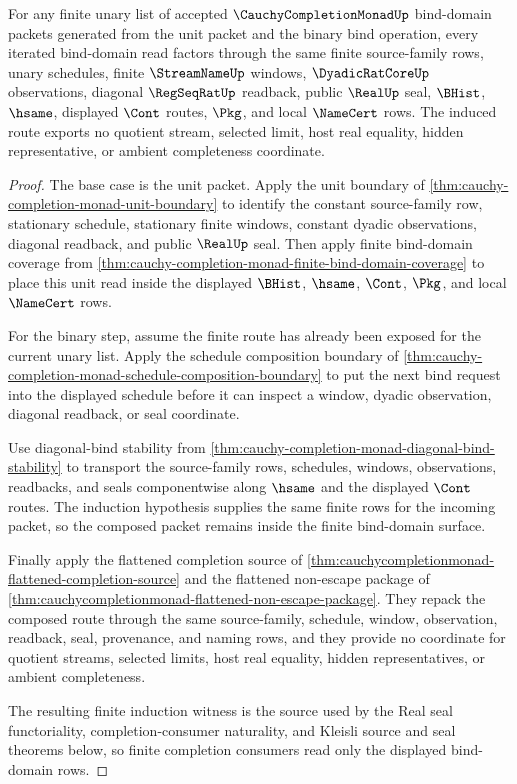 \begin{theorem}
\label{thm:cauchy-completion-monad-finite-bind-domain-induction}
For any finite unary list of accepted $\CauchyCompletionMonadUp$ bind-domain packets generated from the unit packet and the binary bind operation, every iterated bind-domain read factors through the same finite source-family rows, unary schedules, finite $\StreamNameUp$ windows, $\DyadicRatCoreUp$ observations, diagonal $\RegSeqRatUp$ readback, public $\RealUp$ seal, $\BHist$, $\hsame$, displayed $\Cont$ routes, $\Pkg$, and local $\NameCert$ rows. The induced route exports no quotient stream, selected limit, host real equality, hidden representative, or ambient completeness coordinate.
\end{theorem}
\begin{proof}
The base case is the unit packet. Apply the unit boundary of \autoref{thm:cauchy-completion-monad-unit-boundary} to identify the constant source-family row, stationary schedule, stationary finite windows, constant dyadic observations, diagonal readback, and public $\RealUp$ seal. Then apply finite bind-domain coverage from \autoref{thm:cauchy-completion-monad-finite-bind-domain-coverage} to place this unit read inside the displayed $\BHist$, $\hsame$, $\Cont$, $\Pkg$, and local $\NameCert$ rows.

For the binary step, assume the finite route has already been exposed for the current unary list. Apply the schedule composition boundary of \autoref{thm:cauchy-completion-monad-schedule-composition-boundary} to put the next bind request into the displayed schedule before it can inspect a window, dyadic observation, diagonal readback, or seal coordinate.

Use diagonal-bind stability from \autoref{thm:cauchy-completion-monad-diagonal-bind-stability} to transport the source-family rows, schedules, windows, observations, readbacks, and seals componentwise along $\hsame$ and the displayed $\Cont$ routes. The induction hypothesis supplies the same finite rows for the incoming packet, so the composed packet remains inside the finite bind-domain surface.

Finally apply the flattened completion source of \autoref{thm:cauchycompletionmonad-flattened-completion-source} and the flattened non-escape package of \autoref{thm:cauchycompletionmonad-flattened-non-escape-package}. They repack the composed route through the same source-family, schedule, window, observation, readback, seal, provenance, and naming rows, and they provide no coordinate for quotient streams, selected limits, host real equality, hidden representatives, or ambient completeness.

The resulting finite induction witness is the source used by the Real seal functoriality, completion-consumer naturality, and Kleisli source and seal theorems below, so finite completion consumers read only the displayed bind-domain rows.
\end{proof}

